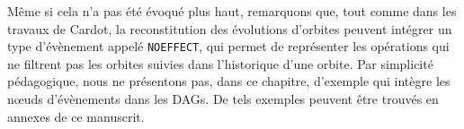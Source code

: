 Même si cela n'a pas été évoqué plus haut, remarquons que, tout comme dans les travaux de Cardot, la reconstitution des évolutions
d'orbites peuvent intégrer un type d'évènement appelé \texttt{NOEFFECT}, qui
permet de représenter les opérations qui ne filtrent pas les orbites suivies
dans l'historique d'une orbite. %
Par simplicité pédagogique, nous ne présentons pas, dans ce chapitre, d'exemple
qui intègre les n\oe uds d'évènements \noeffectnodeevent{} dans les DAGs. %
De tels exemples peuvent être trouvés en annexes de ce manuscrit. %

